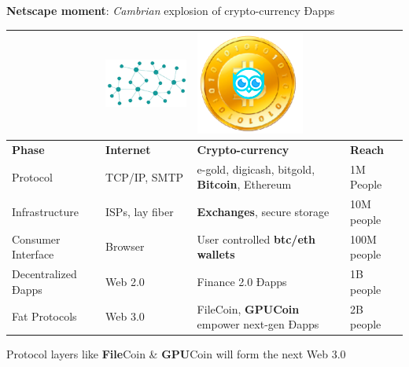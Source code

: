 \textbf{Netscape moment}: \emph{Cambrian} explosion of crypto-currency Ðapps
 

 \begin{adjustbox}{width=.7\textwidth}
\begin{tabularx} {\textwidth}{|X|X|X|X|}
 \hline
& \includegraphics[scale=0.2]{./static/decentnew.png} & \includegraphics[scale=0.2]{./static/hootcoin.png} & \\
 \hline
\textbf{Phase} & \textbf{Internet} & \textbf{Crypto-currency} & \textbf{Reach}\\
\hline
Protocol & TCP/IP, SMTP & e-gold, digicash, bitgold, \textbf{Bitcoin}, Ethereum & 1M People \\
\hline
Infrastructure & ISPs, lay fiber & \textbf{Exchanges}, secure storage & 10M people \\
\hline
Consumer Interface & Browser & User controlled \textbf{btc/eth wallets} & 100M people \\
\hline
Decentralized Ðapps & Web 2.0 & Finance 2.0 Ðapps & 1B people\\
\hline
Fat Protocols & Web 3.0 & FileCoin, \textbf{GPUCoin} empower next-gen Ðapps & 2B people\\

\hline
\end{tabularx}
\end{adjustbox}

Protocol layers like \textbf{File}Coin \& \textbf{GPU}Coin will form the next Web 3.0